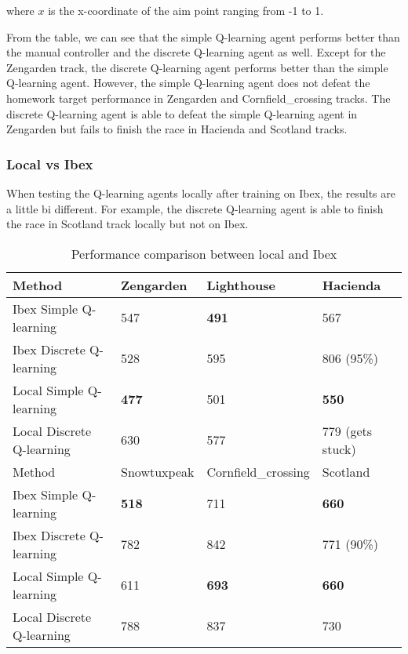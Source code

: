 \documentclass{article}
\begin{document}
where $x$ is the x-coordinate of the aim point ranging from -1 to 1.

From the table, we can see that the simple Q-learning agent performs better than the manual controller and the discrete Q-learning agent as well. Except for the Zengarden track, the discrete Q-learning agent performs better than the simple Q-learning agent. However, the simple Q-learning agent does not defeat the homework target performance in Zengarden and Cornfield\_crossing tracks. The discrete Q-learning agent is able to defeat the simple Q-learning agent in Zengarden but fails to finish the race in Hacienda and Scotland tracks.

\subsubsection{Local vs Ibex}

When testing the Q-learning agents locally after training on Ibex, the results are a little bi different. For example, the discrete Q-learning agent is able to finish the race in Scotland track locally but not on Ibex. 

\begin{table}[h]
    \caption{Performance comparison between local and Ibex}
    \label{local_vs_ibex}
    \centering
    \begin{tabular}{llll}
        \toprule
        Method              & Zengarden    & Lighthouse      & Hacienda  \\
        \midrule
        Ibex Simple Q-learning   & 547          & \textbf{491} & 567  \\
        Ibex Discrete Q-learning & 528          & 595          & 806 (95\%)  \\
        Local Simple Q-learning   & \textbf{477} & 501         & \textbf{550}  \\
        Local Discrete Q-learning & 630         & 577          & 779 (gets stuck)  \\
        \bottomrule
        \toprule
        Method              & Snowtuxpeak  & Cornfield\_crossing & Scotland  \\
        \midrule
        Ibex Simple Q-learning   & \textbf{518} & 711    & \textbf{660}  \\
        Ibex Discrete Q-learning & 782          & 842             & 771 (90\%)  \\
        Local Simple Q-learning   & 611          & \textbf{693}   & \textbf{660}  \\
        Local Discrete Q-learning & 788          & 837             & 730  \\
        \bottomrule
    \end{tabular}
\end{table}
\end{document}
